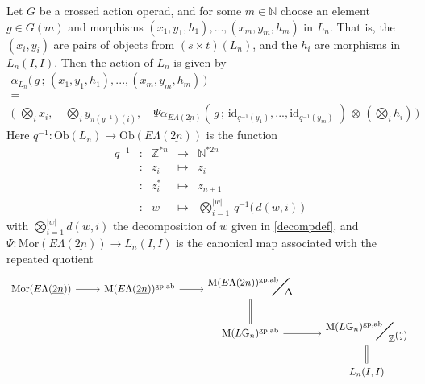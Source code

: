 \documentclass{amsbook} %
\newcommand{\bigquotient}[2]{ \raisebox{0.75\height}{$#1$} \mkern-12mu\scalebox{2}{$\diagup$}\mkern-10mu \raisebox{-0.5\height}{$#2$} }
\newcommand{\ELnn}{E\Lambda(\underline{2n})}
\numberwithin{section}{chapter}
\begin{document}
\begin{prop} \label{crossact} Let $G$ be a crossed action operad, and for some $m \in \mathbb{N}$ choose an element $g \in G(m)$ and morphisms $(x_1, y_1, h_1), ..., (x_m, y_m, h_m)$ in $L_n$. That is, the $(x_i, y_i)$ are pairs of objects from $(s \times t)(L_n)$, and the $h_i$ are morphisms in $L_n(I,I)$. Then the action of $L_n$ is given by
\[ \begin{array}{c}
			\alpha_{L_n}\big( \, g \, ; \, (x_1, y_1, h_1), ..., (x_m, y_m, h_m) \, \big) \\
			= \\
			\big( \, \, \bigotimes_i x_i, \quad \bigotimes_i y_{\pi(g^{-1})(i)}, \quad \Psi \alpha_{\ELnn}( \, g \, ; \, \mathrm{id}_{q^{-1}(y_1)}, ..., \mathrm{id}_{q^{-1}(y_m)} \, \, ) \, \otimes \, (\bigotimes_i h_i) \, \big) 
		\end{array}
\]
Here $q^{-1}: \mathrm{Ob}(L_n) \to \mathrm{Ob}(\ELnn)$ is the function 
\[ \begin{array}{rcrcl}
			q^{-1} & : & \mathbb{Z}^{\ast n} & \to & \mathbb{N}^{\ast 2n} \\
			& : & z_i & \mapsto & z_i \\
			& : & z_i^* & \mapsto & z_{n+1} \\
			& : & w & \mapsto & \bigotimes_{i=1}^{|w|} \, q^{-1}\big( \, d(w, i) \, \big)
		\end{array}
\]
with $\bigotimes_{i=1}^{|w|} d(w, i)$ the decomposition of $w$ given in \cref{decompdef}, and $\Psi: \mathrm{Mor}(\ELnn) \to L_n(I,I)$ is the canonical map associated with the repeated quotient
\[ \begin{tikzcd}
\mathrm{Mor}(\ELnn) \ar[r] & \mathrm{M}(\ELnn)^{\mathrm{gp}, \mathrm{ab}} \ar[r] & \bigquotient{\mathrm{M}(\ELnn)^{\mathrm{gp}, \mathrm{ab}}}{\Delta} \ar[d, equals] & \\
& & \mathrm{M}(L\mathbb{G}_{n})^{\mathrm{gp}, \mathrm{ab}} \ar[r] & \bigquotient{\mathrm{M}(L\mathbb{G}_{n})^{\mathrm{gp}, \mathrm{ab}}}{\mathbb{Z}^{{n}\choose{2}}} \ar[d, equals] \\
& & & L_n(I,I)
\end{tikzcd} \]
\end{prop} 
\end{document}
